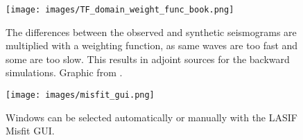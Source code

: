 \begin{figure}[h]
\begin{center}
\texttt{[image: images/TF\_domain\_weight\_func\_book.png]}
\caption{The differences between the observed and synthetic seismograms are multiplied with a weighting function,
as same waves are too fast and some are too slow.
This results in adjoint sources for the backward simulations.
Graphic from \citealp{Fichtner2011a}.}
\label{weight_func}
\end{center}
\end{figure}

\begin{figure}[h]
\begin{center}
\texttt{[image: images/misfit\_gui.png]}
\caption{Windows can be selected automatically or manually with the LASIF Misfit GUI.}
\label{misfit_gui}
\end{center}
\end{figure}





%
%





